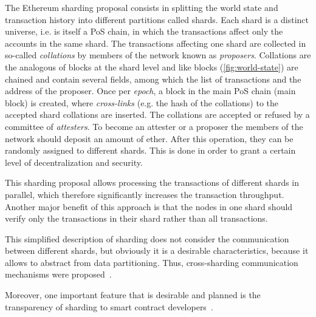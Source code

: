 The Ethereum sharding proposal consists in splitting the world state and
transaction history into different partitions called shards. Each shard is a
distinct universe, i.e. is itself a PoS chain, in which the transactions affect
only the accounts in the same shard. The transactions affecting one shard are
collected in so-called \emph{collations} by members of the network known as
\emph{proposers}. Collations are the analogous of blocks at the shard level and
like blocks (\autoref{fig:world-state}) are chained and contain several fields,
among which the list of transactions and the address of the proposer. Once per
\emph{epoch}, a block in the main PoS chain (main block) is created, where
\emph{cross-links} (e.g. the hash of the collations) to the accepted shard
collations are inserted. The collations are accepted or refused by a committee
of \emph{attesters}. To become an attester or a proposer the members of the
network should deposit an amount of ether. After this operation, they can be
randomly assigned to different shards. This is done in order to grant a certain
level of decentralization and security.

This sharding proposal allows processing the transactions of different shards in
parallel, which therefore significantly increases the transaction throughput.
Another major benefit of this approach is that the nodes in one shard should
verify only the transactions in their shard rather than all
transactions.

This simplified description of sharding does not consider the communication
between different shards, but obviously it is a desirable characteristics,
because it allows to abstract from data partitioning.
Thus, cross-sharding communication mechanisms were
proposed~\cite{bib:sharding-faq}.

Moreover, one important feature that is desirable and planned is the
transparency of sharding to smart contract developers~\cite{bib:sharding-faq}.

